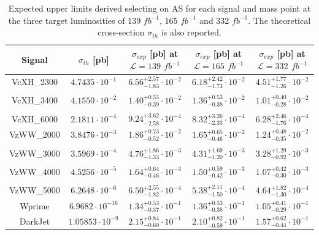 \begin{table}[htbp]
\centering
\begin{tabular}{|c|c||c|c|c|}
\hline
\rowcolor{lightgray}
\textbf{Signal} &  \textbf{$\sigma_{th}$ [pb]} & \shortstack{\textbf{$\sigma_{exp}$ [pb]}\\\textbf{at $\mathcal{L}=139$ $fb^{-1}$}} & \shortstack{\textbf{$\sigma_{exp}$ [pb]}\\\textbf{at $\mathcal{L}=165$ $fb^{-1}$}} & \shortstack{\textbf{$\sigma_{exp}$ [pb]}\\\textbf{at $\mathcal{L}=332$ $fb^{-1}$}}\\
\hline\hline 

VcXH\_2300 &  $4.7435 \cdot 10^{-1}$ & $6.56^{+2.57}_{-1.83} \cdot 10^{-2}$ & $6.18^{+2.42}_{-1.73} \cdot 10^{-2}$ & $4.51^{+1.77}_{-1.26} \cdot 10^{-2}$ \\
&&&&\\ 
VcXH\_3400 &  $4.1550 \cdot 10^{-2}$ & $1.40^{+0.55}_{-0.39} \cdot 10^{-2}$ & $1.36^{+0.53}_{-0.38} \cdot 10^{-2}$ & $1.01^{+0.40}_{-0.28} \cdot 10^{-2}$ \\
&&&&\\ 
VcXH\_6000 &  $2.1811 \cdot 10^{-4}$ & $9.24^{+3.62}_{-2.58} \cdot 10^{-4}$ & $8.32^{+3.26}_{-2.33} \cdot 10^{-4}$ & $6.28^{+2.46}_{-1.76} \cdot 10^{-4}$ \\
\hline

VzWW\_2000 & $3.8476 \cdot 10^{-3}$ & $1.86^{+0.73}_{-0.52} \cdot 10^{-2}$ & $1.65^{+0.65}_{-0.46} \cdot 10^{-2}$ & $1.24^{+0.48}_{-0.35} \cdot 10^{-2}$ \\
&&&&\\
VzWW\_3000 & $3.5969 \cdot 10^{-4}$ & $4.76^{+1.86}_{-1.33} \cdot 10^{-3}$ & $4.31^{+1.69}_{-1.20} \cdot 10^{-3}$ & $3.28^{+1.29}_{-0.92} \cdot 10^{-3}$ \\
&&&&\\ 
VzWW\_4000 & $4.5256 \cdot 10^{-5}$ & $1.64^{+0.64}_{-0.46} \cdot 10^{-3}$ & $1.50^{+0.59}_{-0.42} \cdot 10^{-3}$ & $1.07^{+0.42}_{-0.30} \cdot 10^{-3}$ \\
&&&&\\ 
VzWW\_5000 & $6.2648 \cdot 10^{-6}$ & $6.50^{+2.55}_{-1.82} \cdot 10^{-4}$ & $5.38^{+2.11}_{-1.50} \cdot 10^{-4}$ & $4.64^{+1.82}_{-1.30} \cdot 10^{-4}$ \\
\hline
 
 Wprime  & $6.9682 \cdot 10^{-16}$  & $1.34^{+0.53}_{-0.37} \cdot 10^{-1}$ & $1.36^{+0.53}_{-0.38} \cdot 10^{-1}$ & $1.05^{+0.41}_{-0.29} \cdot 10^{-1}$ \\
\hline
 
 DarkJet & $1.05853 \cdot 10^{-9}$ & $2.15^{+0.84}_{-0.60} \cdot 10^{-1}$ & $2.10^{+0.82}_{-0.59} \cdot 10^{-1}$ & $1.57^{+0.62}_{-0.44} \cdot 10^{-1}$ \\
\hline


\end{tabular}
\caption{Expected upper limits derived selecting on AS for each signal and mass point at the three target luminosities of 139 $fb^{-1}$, 165 $fb^{-1}$ and 332 $fb^{-1}$. The theoretical cross-section $\sigma_{th}$ is also reported.}
\label{tab:ADJJ/UpperLimits/SigmaLimits_AS}
\end{table}


